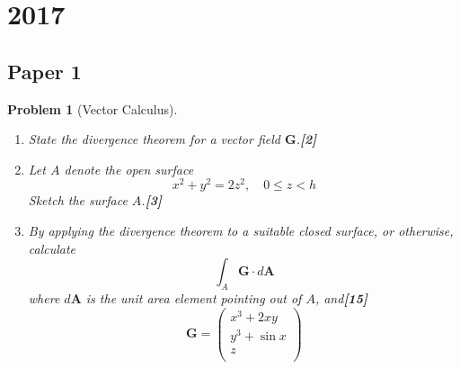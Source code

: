 \documentclass[a4paper]{article}
\theoremstyle{new}
\newtheorem{qns}{Problem}[section]
\begin{document}
\section{2017}
\subsection{Paper 1}
\begin{qns}[Vector Calculus]\leavevmode
\begin{enumerate}[label=(\alph*)]
    \item State the divergence theorem for a vector field $\mathbf{G}$.\hfill \textbf{[2]}
    \item Let $A$ denote the open surface
$$x^2+y^2=2z^2,\quad 0\leq z<h$$
Sketch the surface $A$.\hfill \textbf{[3]}
\item  By applying the divergence theorem to a suitable closed surface, or otherwise, calculate
$$\int_A\mathbf{G}\cdot d\mathbf{A}$$
where $d\mathbf{A}$ is the unit area element pointing out of $A$, and\hfill \textbf{[15]}
$$\mathbf{G}=\begin{pmatrix}x^3+2xy\\y^3+\sin x\\z\\\end{pmatrix}$$
\end{enumerate}
\end{qns}
\end{document}
